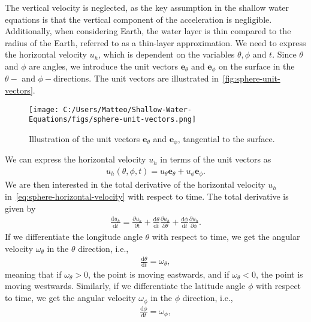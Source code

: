 The vertical velocity is neglected, as the key assumption in the shallow water equations is that the vertical component of the acceleration is negligible.
Additionally, when considering Earth, the water layer is thin compared to the radius of the Earth, referred to as a thin-layer approximation.
We need to express the horizontal velocity $u_h$, which is dependent on the variables $\theta, \phi$ and $t$.
Since $\theta$ and $\phi$ are angles, we introduce the unit vectors $\mathbf{e}_\theta$ and $\mathbf{e}_\phi$ on the surface in the $\theta-$ and $\phi-$directions.
The unit vectors are illustrated in~\autoref{fig:sphere-unit-vectors}.
\begin{figure}[H]
    \centering
    \texttt{[image: C:/Users/Matteo/Shallow-Water-Equations/figs/sphere-unit-vectors.png]}
    \caption{Illustration of the unit vectors $\mathbf{e}_\theta$ and $\mathbf{e}_\phi$, tangential to the surface.}\label{fig:sphere-unit-vectors}
\end{figure}
We can express the horizontal velocity $u_h$ in terms of the unit vectors as
\begin{align}\label{eq:sphere-horizontal-velocity}
    u_h(\theta, \phi, t) = u_\theta \mathbf{e}_\theta + u_\phi \mathbf{e}_\phi.
\end{align}
We are then interested in the total derivative of the horizontal velocity $u_h$ in~\eqref{eq:sphere-horizontal-velocity} with respect to time.
The total derivative is given by
\begin{align}\label{eq:sphere-total-derivative}
    \frac{\text{d}u_h}{\text{d}t} = \frac{\partial u_h}{\partial t} + \frac{\text{d}\theta}{\text{d}t} \frac{\partial u_h}{\partial \theta} + \frac{\text{d}\phi}{\text{d}t} \frac{\partial u_h}{\partial \phi}.
\end{align}
If we differentiate the longitude angle $\theta$ with respect to time, we get the angular velocity $\omega_\theta$ in the $\theta$ direction, i.e.,
\begin{align*}
    \frac{\text{d}\theta}{\text{d}t} = \omega_\theta,
\end{align*}
meaning that if $\omega_\theta > 0$, the point is moving eastwards, and if $\omega_\theta < 0$, the point is moving westwards.
Similarly, if we differentiate the latitude angle $\phi$ with respect to time, we get the angular velocity $\omega_\phi$ in the $\phi$ direction, i.e.,
\begin{align*}
    \frac{\text{d}\phi}{\text{d}t} = \omega_\phi,
\end{align*}
